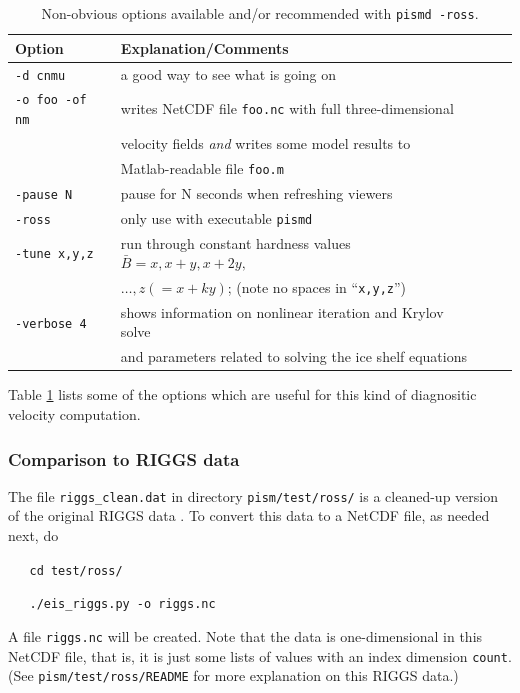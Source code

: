\documentclass[11pt,final]{amsart}
\begin{document}
\small
\begin{table}[h]
\caption{Non-obvious options available and/or recommended with \texttt{pismd -ross}.}\label{tab:rossoptions}
\begin{tabular}{@{}llll}\hline
\textbf{Option} & \textbf{Explanation/Comments} \\ \hline
  \verb|-d cnmu| &       a good way to see what is going on \\
  \verb|-o foo -of nm| &  writes NetCDF file \verb|foo.nc| with full three-dimensional \\
    & velocity fields \emph{and} writes some model results to \\
    & Matlab-readable file \verb|foo.m| \\
  \verb|-pause N| &      pause for N seconds when refreshing viewers \\
  \verb|-ross| &         only use with executable \verb|pismd| \\
  \verb|-tune x,y,z| &   run through constant hardness values $\bar B = x, x+y, x+2y,$ \\
 & $\dots, z(=x+ky)$; (note no spaces in ``\verb|x,y,z|'') \\
  \verb|-verbose 4| &      shows information on nonlinear iteration and Krylov solve \\
    & and parameters related to solving the ice shelf equations \\
\hline
\end{tabular}
\end{table}
\normalsize

Table \ref{tab:rossoptions} lists some of the options which are useful for this kind of diagnositic velocity computation.

\subsubsection{Comparison to RIGGS data}  The file \verb|riggs_clean.dat| in directory \verb|pism/test/ross/| is a cleaned-up version of the original RIGGS data \cite{RIGGS1, RIGGS2}.  To convert this data to a NetCDF file, as needed next, do

\verb|   cd test/ross/|

\verb|   ./eis_riggs.py -o riggs.nc|

\noindent A file \verb|riggs.nc| will be created.  Note that the data is one-dimensional in this NetCDF file, that is, it is just some lists of values with an index dimension \verb|count|.  (See \verb|pism/test/ross/README| for more explanation on this RIGGS data.)
\end{document}
